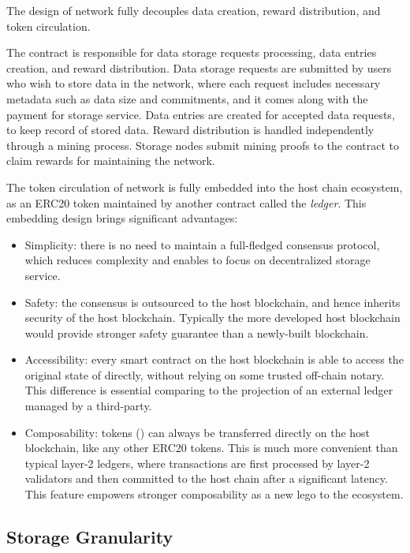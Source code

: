 The design of \project network fully decouples data creation, reward distribution, and token circulation.

The \project contract is responsible for data storage requests processing, data entries creation, and reward distribution. 
Data storage requests are submitted by users who wish to store data in the \project network,
where each request includes necessary metadata such as data size and commitments,
and it comes along with the payment for storage service.
Data entries are created for accepted data requests, to keep record of stored data.
Reward distribution is handled independently through a mining process.
Storage nodes submit mining proofs to the \project contract to claim rewards for maintaining the \project network.


The token circulation of \project network is fully embedded into the host chain ecosystem,
as an ERC20 token maintained by another contract called the \emph{\token ledger}.
% 
This embedding design brings significant advantages:
\begin{itemize}
	\item Simplicity: there is no need to maintain a full-fledged  consensus protocol,
	which reduces complexity and enables \project to focus on decentralized storage service.

	\item Safety: the consensus is outsourced to the host blockchain, and hence inherits security of the host blockchain. 
	Typically the more developed host blockchain would provide stronger safety guarantee than a newly-built blockchain.

	\item Accessibility: every smart contract on the host blockchain is able to access the original state of \project directly, without relying on some trusted off-chain notary. This difference is essential comparing to the projection of an external ledger managed by a third-party.

	\item Composability: \project tokens (\token) can always be transferred directly on the host blockchain, like any other ERC20 tokens. 
	This is much more convenient than typical layer-2 ledgers, where transactions are first processed by layer-2 validators and then committed to the host chain after a significant latency.
	This feature empowers \project stronger composability as a new lego to the ecosystem.
\end{itemize}


\subsection{Storage Granularity}

